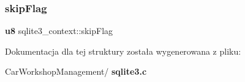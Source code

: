 \mbox{\label{structsqlite3__context_a29c404b8744ed5967960c576f3e59bd3}} 
\subsubsection{skipFlag}
{\footnotesize\ttfamily \textbf{ u8} sqlite3\+\_\+context\+::skip\+Flag}



Dokumentacja dla tej struktury została wygenerowana z pliku\+:\begin{DoxyCompactItemize}
\item 
Car\+Workshop\+Management/\textbf{ sqlite3.\+c}\end{DoxyCompactItemize}
